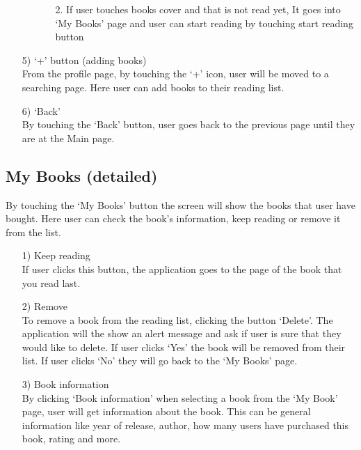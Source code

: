 \documentclass[conference]{IEEEtran}
\begin{document}
\begin{itemize}
\begin{itemize}
\begin{itemize}
            \item[2.] If user touches books cover and that is not read yet, It goes into ‘My Books’ page and user can start reading by touching start reading button
        \end{itemize}
    \end{itemize}
    \item[5)] ‘+’ button (adding books) \\
    From the profile page, by touching the ‘+’ icon, user will be moved to a searching page. Here user can add books to their reading list.
    \item[6)] ‘Back’ \\
    By touching the ‘Back’ button, user goes back to the previous page until they are at the Main page.
    \end{itemize}
    
\subsection{My Books (detailed)}
By touching the ‘My Books’ button the screen will show the books that user have bought. Here user can check the book's information, keep reading or remove it from the list.
\begin{itemize}
    \item[1)] Keep reading \\
    If user clicks this button, the application goes to the page of the book that you read last.
    \item[2)] Remove \\
    To remove a book from the reading list, clicking the button ‘Delete’. The application will the show an alert message and ask if user is sure that they would like to delete. If user clicks ‘Yes’ the book will be removed from their list. If user clicks ‘No’ they will go back to the ‘My Books’ page.
    \item[3)] Book information \\
    By clicking ‘Book information’ when selecting a book from the ‘My Book’ page, user will get information about the book. This can be general information like year of release, author, how many users have purchased this book, rating and more. 
\end{itemize}    
\end{document}
